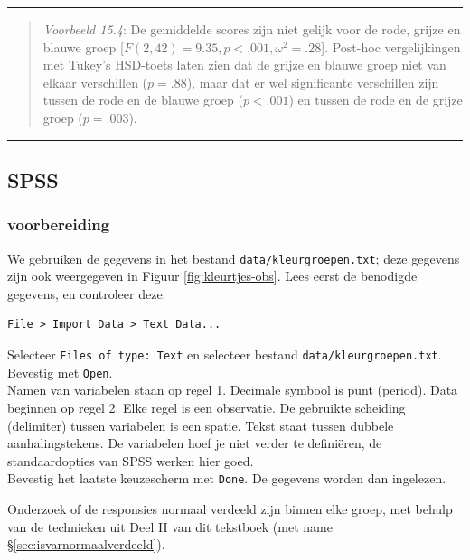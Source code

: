 \documentclass[
]{book}
\begin{document}
\begin{center}\rule{0.5\linewidth}{0.5pt}\end{center}

\begin{quote}
\emph{Voorbeeld 15.4}:
De gemiddelde scores zijn niet gelijk voor de rode, grijze en blauwe groep
{[}\(F(2,42) = 9.35, p <.001, \omega^2 = .28\){]}.
Post-hoc vergelijkingen met Tukey's HSD-toets laten zien dat de grijze en blauwe groep niet van elkaar verschillen (\(p=.88\)), maar dat er wel significante verschillen zijn tussen de rode en de blauwe groep (\(p<.001\)) en tussen de rode en de grijze groep (\(p=.003\)).
\end{quote}

\begin{center}\rule{0.5\linewidth}{0.5pt}\end{center}

\subsection{SPSS}\label{spss-12}

\subsubsection{voorbereiding}\label{voorbereiding-1}

We gebruiken de gegevens in het bestand \texttt{data/kleurgroepen.txt}; deze gegevens zijn ook weergegeven in Figuur \ref{fig:kleurtjes-obs}.
Lees eerst de benodigde gegevens, en controleer deze:

\begin{verbatim}
File > Import Data > Text Data...
\end{verbatim}

Selecteer \texttt{Files\ of\ type:\ Text} en selecteer bestand
\texttt{data/kleurgroepen.txt}. Bevestig met \texttt{Open}.\\
Namen van variabelen staan op regel 1. Decimale symbool is punt
(period). Data beginnen op regel 2. Elke regel is een observatie. De
gebruikte scheiding (delimiter) tussen variabelen is een spatie. Tekst
staat tussen dubbele aanhalingstekens. De variabelen hoef je niet verder
te definiëren, de standaardopties van SPSS werken hier goed.\\
Bevestig het laatste keuzescherm met \texttt{Done}. De gegevens
worden dan ingelezen.

Onderzoek of de responsies normaal verdeeld zijn binnen elke groep, met behulp van de
technieken uit Deel II van dit tekstboek (met name
§\ref{sec:isvarnormaalverdeeld}).
\end{document}
